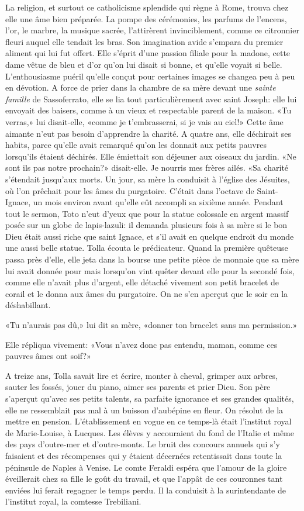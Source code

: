 La religion, et surtout ce catholicisme splendide qui règne à Rome, trouva chez elle une âme bien préparée. La pompe des cérémonies, les parfums de l’encens, l’or, le marbre, la musique sacrée, l’attirèrent invinciblement, comme ce citronnier fleuri auquel elle tendait les bras. Son imagination avide s’empara du premier aliment qui lui fut offert. Elle s’éprit d’une passion filiale pour la madone, cette dame vêtue de bleu et d’or qu’on lui disait si bonne, et qu’elle voyait si belle. L’enthousiasme puéril qu’elle conçut pour certaines images se changea peu à peu en dévotion. A force de prier dans la chambre de sa mère devant une \emph{sainte famille} de Sassoferrato, elle se lia tout particulièrement avec saint Joseph: elle lui envoyait des baisers, comme à un vieux et respectable parent de la maison. «Tu verras,» lui disait-elle, «comme je t’embrasserai, si je vais au ciel!» Cette âme aimante n’eut pas besoin d’apprendre la charité. A quatre ans, elle déchirait ses habits, parce qu’elle avait remarqué qu’on les donnait aux petits pauvres lorsqu’ils étaient déchirés. Elle émiettait son déjeuner aux oiseaux du jardin. «Ne sont ils pas notre prochain?» disait-elle. Je nourris mes frères ailés. «Sa charité s’étendait jusqu’aux morts. Un jour, sa mère la conduisit à l’église des Jésuites, où l’on prêchait pour les âmes du purgatoire. C’était dans l’octave de Saint-Ignace, un mois environ avant qu’elle eût accompli sa sixième année. Pendant tout le sermon, Toto n’eut d’yeux que pour la statue colossale en argent massif posée sur un globe de lapis-lazuli: il demanda plusieurs fois à sa mère si le bon Dieu était aussi riche que saint Ignace, et s’il avait en quelque endroit du monde une aussi belle statue. Tolla écouta le prédicateur. Quand la première quêteuse passa près d’elle, elle jeta dans la bourse une petite pièce de monnaie que sa mère lui avait donnée pour mais lorsqu’on vint quêter devant elle pour la secondé fois, comme elle n’avait plus d’argent, elle détaché vivement son petit bracelet de corail et le donna aux âmes du purgatoire. On ne s’en aperçut que le soir en la déshabillant.

«Tu n’aurais pas dû,» lui dit sa mère, «donner ton bracelet sans ma permission.»

Elle répliqua vivement: «Vous n’avez donc pas entendu, maman, comme ces pauvres âmes ont soif?»

A treize ans, Tolla savait lire et écrire, monter à cheval, grimper aux arbres, sauter les fossés, jouer du piano, aimer ses parents et prier Dieu. Son père s’aperçut qu’avec ses petits talents, sa parfaite ignorance et ses grandes qualités, elle ne ressemblait pas mal à un buisson d’aubépine en fleur. On résolut de la mettre en pension. L’établissement en vogue en ce temps-là était l’institut royal de Marie-Louise, à Lucques. Les élèves y accouraient du fond de l’Italie et même des pays d’outre-mer et d’outre-monts. Le bruit des concours annuels qui s’y faisaient et des récompenses qui y étaient décernées retentissait dans toute la péninsule de Naples à Venise. Le comte Feraldi espéra que l’amour de la gloire éveillerait chez sa fille le goût du travail, et que l’appât de ces couronnes tant enviées lui ferait regagner le temps perdu. Il la conduisit à la surintendante de l’institut royal, la comtesse Trebiliani.

